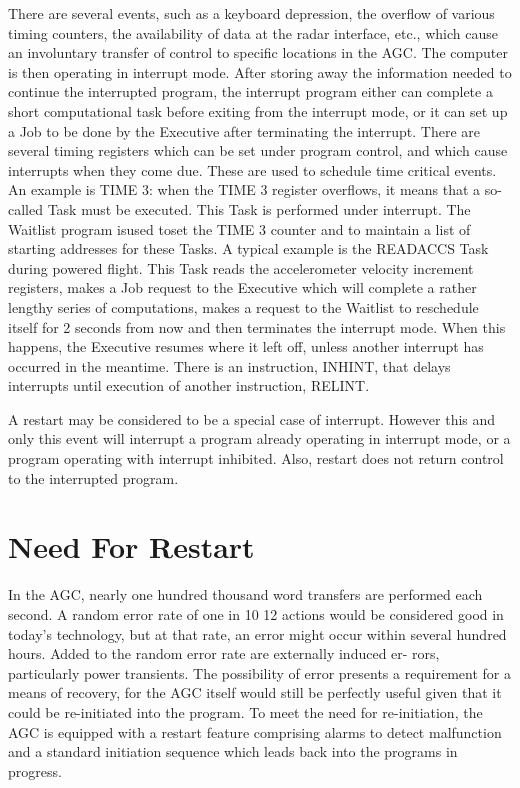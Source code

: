 \documentclass[oxford]{ahsan}
\begin{document}
There are several events, such as a keyboard depression, the overflow of various timing
counters, the availability of data at the radar interface, etc., which cause an
involuntary transfer of control to specific locations in the AGC. The computer is then
operating in interrupt mode. After storing away the information needed to continue the
interrupted program, the interrupt program either can complete a short computational
task before exiting from the interrupt mode, or it can set up a Job to be done by the
Executive after terminating the interrupt. There are several timing registers which can
be set under program control, and which cause interrupts when they come  due. These are
used to schedule time critical events. An example is TIME 3: when the TIME 3 register
overflows, it means that a so-called Task must be executed. This Task is performed
under interrupt. The Waitlist program isused  toset  the TIME 3 counter and to maintain
a list of starting addresses for these Tasks. A typical example is the READACCS Task
during powered flight. This Task reads the accelerometer velocity increment registers,
makes a Job request to the Executive which will complete a rather lengthy series of
computations, makes a request to the Waitlist to reschedule itself for 2 seconds from
now and then terminates the interrupt mode. When this happens, the Executive resumes
where it left off, unless another interrupt has occurred in the meantime. There is an
instruction, INHINT, that delays interrupts until execution of another instruction,
RELINT.

A restart may be considered to be a special case of interrupt. However this and only
this event will interrupt a program already operating in interrupt mode, or a program
operating with interrupt inhibited. Also, restart does not return control to the
interrupted program.

\section{Need For Restart}

In the AGC, nearly one hundred thousand word transfers are performed each second. A
random error rate of one in 10 12 actions would be considered good in today’s
technology, but at that rate, an error might occur within several hundred hours. Added
to the random error rate are externally induced er- rors, particularly power
transients. The possibility of error presents a requirement for a means of recovery,
for the AGC itself would still be perfectly useful given that it could be re-initiated
into the program. To meet the need for re-initiation, the AGC is equipped with a
restart feature comprising alarms to detect malfunction and a standard initiation
sequence which leads back into the programs in progress.
\end{document}
